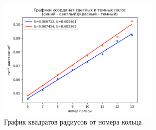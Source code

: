\documentclass[a4paper, 12pt]{article}
\begin{document}

\begin{figure}[H]
    \centering
    \includegraphics[width=0.7\textwidth]{oleg1.png}
    \caption{График квадратов радиусов от номера кольца}
    \label{fig:setup}
\end{figure}

\end{document}
